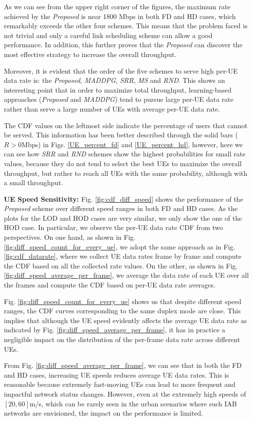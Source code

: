 As we can see from the upper right corner of the figures, the maximum rate achieved by the \textit{Proposed} is near 1800 Mbps in both FD and HD cases, which remarkably exceeds the other four schemes.
This means that the problem faced is not trivial and only a careful link scheduling scheme can allow a good performance. In addition, this further proves that the \textit{Proposed} can discover the most effective strategy to increase the overall throughput.

Moreover, it is evident that the order of the five schemes to serve high per-UE data rate is: the \textit{Proposed}, \textit{MADDPG}, \textit{SRR}, \textit{MS} and \textit{RND}. This shows an interesting point that in order to maximize total throughput, learning-based approaches (\textit{Proposed} and \textit{MADDPG}) tend to pursue large per-UE data rate rather than serve a large number of UEs with average per-UE data rate.


The CDF values on the leftmost side indicate the percentage of users that cannot be served. This information has been better described through the solid bars ($R>0$Mbps) in Figs. \ref{UE_percent_fd} and \ref{UE_percent_hd}, however, here we can see how \textit{SRR} and \textit{RND} schemes show the highest probabilities for small rate values, because they do not tend to select the best UEs to maximize the overall throughput, but rather to reach all UEs with the same probability, although with a small throughput.

\textbf{UE Speed Sensitivity:}
Fig. \ref{fig:cdf_diff_speed} shows the performance of the \textit{Proposed} scheme over different speed ranges in both FD and HD cases. As the plots for the LOD and HOD cases are very similar, we only show the one of the HOD case. In particular, we observe the per-UE data rate CDF from two perspectives.
On one hand, as shown in Fig. \ref{fig:diff_speed_count_for_every_ue}, we adopt the same approach as in Fig. \ref{fig:cdf_datarate}, where we collect UE data rates frame by frame and compute the CDF based on all the collected rate values.
On the other, as shown in Fig. \ref{fig:diff_speed_average_per_frame}, we average the data rate of each UE over all the frames and compute the CDF based on per-UE data rate averages.

Fig. \ref{fig:diff_speed_count_for_every_ue} shows us that despite different speed ranges, the CDF curves corresponding to the same duplex mode are close. This implies that although the UE speed evidently affects the average UE data rate as indicated by Fig. \ref{fig:diff_speed_average_per_frame}, it has in practice a negligible impact on the distribution of the per-frame data rate across different UEs.

From Fig. \ref{fig:diff_speed_average_per_frame}, we can see that in both the FD and HD cases, increasing UE speeds reduces average UE data rates. This is reasonable because extremely fast-moving UEs can lead to more frequent and impactful network status changes.
However, even at the extremely high speeds of $[20,60]$m/s, which can be rarely seen in the urban scenarios where such IAB networks are envisioned, the impact on the performance is limited.
